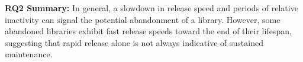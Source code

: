 







\vspace{-0.1cm}
\begin{tcolorbox}[colframe=white, colback=blue!5, left=1mm, right=1mm, sharp corners]
\textbf{RQ2 Summary:} In general, a slowdown in release speed and periods of relative inactivity can signal the potential abandonment of a library. However, some abandoned libraries exhibit fast release speeds toward the end of their lifespan, suggesting that rapid release alone is not always indicative of sustained maintenance.
\end{tcolorbox}


